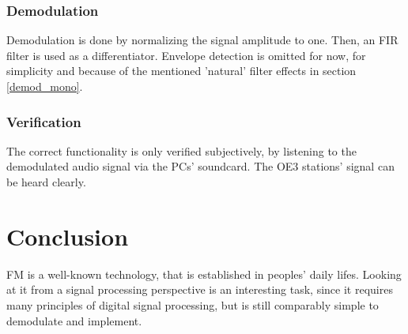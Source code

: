 \documentclass[conference]{IEEEtran}
\begin{document}
    \subsubsection{Demodulation}
      Demodulation is done by normalizing the signal amplitude to one.
      Then, an FIR filter is used as a differentiator.
      Envelope detection is omitted for now, for simplicity and because of the mentioned 'natural' filter effects in section \ref{demod_mono}.
    \subsubsection{Verification}
      The correct functionality is only verified subjectively, by listening to the demodulated audio signal via the PCs' soundcard.
      The OE3 stations' signal can be heard clearly.

\section{Conclusion}
  FM is a well-known technology, that is established in peoples' daily lifes.
  Looking at it from a signal processing perspective is an interesting task, since it requires many principles of digital signal processing, but is still comparably simple to demodulate and implement.

%
%

\end{document}
